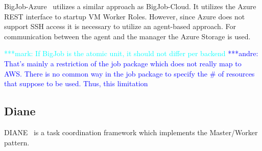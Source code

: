 \documentclass[]{article}
\newcommand{\alnote}[1]{ {\textcolor{blue} { ***andre: #1 }}}
\newcommand{\msnote}[1]{ {\textcolor{cyan} { ***mark: #1 }}}
\newcommand{\alnote}[1]{}
\begin{document}
BigJob-Azure~\cite{10.1109/CloudCom.2010.85} utilizes a similar approach as
BigJob-Cloud. It utilizes the Azure REST interface to startup VM Worker Roles.
However, since Azure does not support SSH access it is necessary to utilize an
agent-based approach. For communication between the agent and the manager the
Azure Storage is used.

\msnote{If BigJob is the atomic unit, it should not differ per
backend}\alnote{That's mainly a restriction of the job package which does not
really map to AWS. There is no common way in the job package to specify the \#
of resources that suppose to be used. Thus, this limitation}


\subsection{Diane}


DIANE~\cite{Moscicki:908910} is a task coordination framework which implements 
the Master/Worker pattern. 
\end{document}
